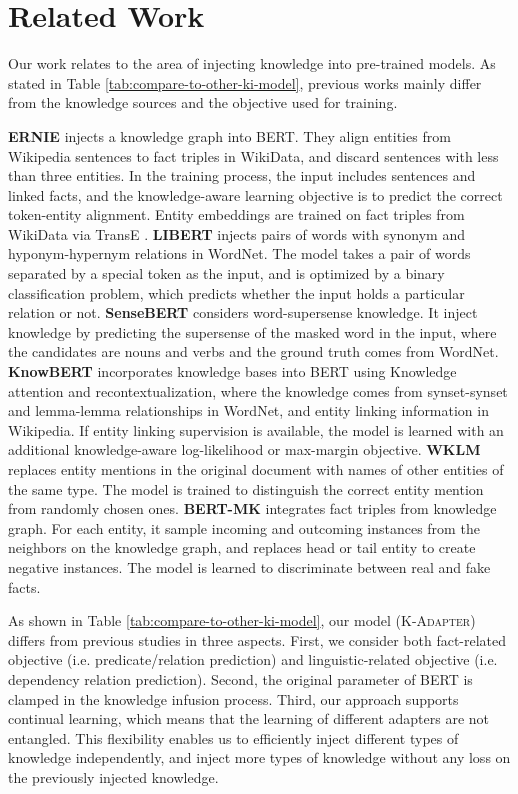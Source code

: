 \documentclass[11pt,a4paper]{article}
\begin{document}
\section{Related Work}
\label{related_work}
Our work relates to the area of injecting knowledge into pre-trained models. As stated in Table \ref{tab:compare-to-other-ki-model}, previous works mainly differ from the knowledge sources and the objective used for training. 

\textbf{ERNIE} \citep{zhang2019ernie} injects a knowledge graph into BERT. They align entities from Wikipedia sentences to fact triples in WikiData, and discard sentences with less than three entities.
In the training process, the input includes sentences and linked facts, and the knowledge-aware learning objective is to predict the correct token-entity alignment. Entity embeddings are trained on fact triples from WikiData via TransE \citep{bordes2013translating}.
\textbf{LIBERT} \citep{lauscher2019informing} injects pairs of words with synonym and hyponym-hypernym relations in WordNet. The model takes a pair of words separated by a special token as the input, and is optimized by a binary classification problem, which predicts whether the input holds a particular relation or not.
\textbf{SenseBERT} \citep{levine2019sensebert} considers word-supersense knowledge. 
It inject knowledge by predicting the supersense of the masked word in the input, where the candidates are nouns and verbs and the ground truth comes from WordNet.
\textbf{KnowBERT} \citep{peters2019knowledge} incorporates knowledge bases into BERT using Knowledge attention and recontextualization, where the knowledge comes from synset-synset and lemma-lemma relationships in WordNet, and entity linking information in Wikipedia. If entity linking supervision is available, the model is learned with an additional knowledge-aware log-likelihood or max-margin objective.
\textbf{WKLM} \citep{xiong2019pretrained} replaces entity mentions in the original document with names of other entities of the same type.
The model is trained to distinguish the correct entity mention from randomly chosen ones.
\textbf{BERT-MK} \citep{he2019integrating} integrates fact triples from knowledge graph. For each entity, it sample incoming and outcoming instances from the neighbors on the knowledge graph, and replaces head or tail entity to create negative instances. The model is learned to discriminate between real and fake facts.


As shown in Table \ref{tab:compare-to-other-ki-model}, our model (\textsc{K-Adapter}) differs from previous studies in three aspects. First, we consider both fact-related objective (i.e. predicate/relation prediction) and linguistic-related objective (i.e. dependency relation prediction). 
Second, the original parameter of BERT is clamped in the knowledge infusion process. Third, our approach supports continual learning, which means that the learning of different adapters are not entangled. This flexibility enables us to efficiently inject different types of knowledge independently, and inject more types of knowledge without any loss on the previously injected knowledge. 
\end{document}
